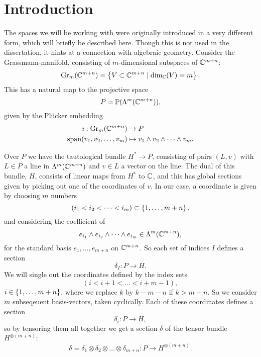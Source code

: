 \chapter{Introduction}
\label{chap:introduktion}

The spaces we will be working with were originally introduced
in a very different form, which will briefly be described here. Though
this is not used in the dissertation, it hints at a connection with
algebraic geometry.
Consider the Grassmann-manifold, consisting of $m$-dimensional
subspaces of $\mathbb{C}^{{m+n}}$:
\[ \mathrm{Gr}_m(\mathbb{C}^{{m+n}}) = \left\{ V \subset \mathbb{C}^{{m+n}} \mid
  \dim_{\mathbb{C}}(V) = m \right\}. \]
This has a natural map to the projective space
\[ P = \mathbb{P}(\Lambda^m(\mathbb{C}^{m+n})), \]
given by the Pl\"ucker embedding
\begin{align*}
  \imath : \mathrm{Gr}_m(\mathbb{C}^{{m+n}}) &\to P \\
  \operatorname{span}(v_1,v_2,\dots,v_m) &\mapsto v_1\wedge v_2\wedge \dots
                            \wedge v_m.
\end{align*}

Over $P$ we have the tautological bundle $H^*\to P$, consisting of
pairs $(L,v)$ with $L \in P$ a line in $\Lambda^m(\mathbb{C}^{m+n})$ and $v\in
L$ a vector on the line. The dual of
this bundle, $H$, consists of linear maps from $H^*$ to $\mathbb{C}$, and 
this has global sections given by picking out one of the
coordinates of $v$. In our case, a coordinate is given by choosing $m$
numbers
\[ (i_1 < i_2 < \dots < i_m) \subset \left\{ 1,\dots,m+n \right\}, \]
and considering the coefficient of
\[ e_{i_1}\wedge e_{i_2}\wedge \dots \wedge e_{i_m} \in
\Lambda^m(\mathbb{C}^{m+n}), \]
for the standard basis $e_1,\dots,e_{m+n}$ on $\mathbb{C}^{m+n}$. So each
set of indices $I$ defines a section
\[ \delta_I : P \to H. \]
We will single out the coordinates defined by the index sets
\[ (i < i+1 < \dots < i+m-1), \]
$i \in \left\{ 1,\dots,m+n \right\}$, where we replace $k$ by $k-m-n$ if
$k > m+n$. So we consider $m$ subseqeuent basis-vectors,
taken cyclically. Each of these coordinates defines a section
\[ \delta_i : P \to H, \]
so by tensoring them all together we get a section $\delta$ of the
tensor bundle $H^{\otimes(m+n)}$:
\[ \delta = \delta_1\otimes\delta_2\otimes\dots\otimes\delta_{m+n} : P
\to H^{\otimes(m+n)}. \]

